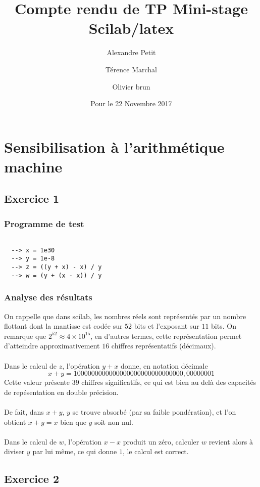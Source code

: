 \documentclass[a4paper,12pt]{article}
\title{Compte rendu de TP Mini-stage Scilab/latex}
\author{Alexandre Petit \and Térence Marchal \and Olivier brun }
\date{Pour le 22 Novembre 2017}
\begin{document}
\maketitle
\section{ Sensibilisation à l'arithmétique machine}
\subsection{ Exercice 1}

\subsubsection{Programme de test}
\begin{verbatim}

  --> x = 1e30
  --> y = 1e-8
  --> z = ((y + x) - x) / y
  --> w = (y + (x - x)) / y
\end{verbatim}

\subsubsection{Analyse des résultats}
On rappelle que dans scilab, les nombres réels sont représentés par un nombre flottant dont la mantisse est codée sur $52$ bits et l'exposant sur $11$ bits. On remarque que $2^{52} \approx 4 \times 10^{15}$, en d'autres termes, cette représentation permet d'atteindre approximativement $16$ chiffres représentatifs (décimaux). \\\\
Dans le calcul de $z$, l'opération $y + x$ donne, en notation décimale 
$$
  x + y = 1000000000000000000000000000000,00000001
$$
\newline
Cette valeur présente $39$ chiffres significatifs, ce qui est bien au delà des capacités de repésentation en double précision.\\\\
De fait, dans $x + y$, $y$ se trouve absorbé (par sa faible pondération), et l'on obtient $x + y = x$ bien que $y$ soit non nul.\\\\
Dans le calcul de $w$, l'opération $x - x$ produit un zéro, calculer $w$ revient alors à diviser $y$ par lui même, ce qui donne $1$, le calcul est correct.

\subsection{ Exercice 2}
\end{document}
